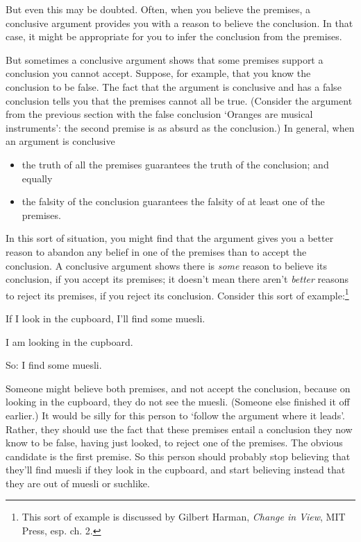 But even this may be doubted. Often, when you believe the premises, a conclusive argument provides you with a reason to believe the conclusion. In that case, it might be appropriate for you to infer the conclusion from the premises.

But sometimes a conclusive argument shows that some premises support a conclusion you cannot accept. Suppose, for example, that you know the conclusion to be false. The fact that the argument is conclusive and has a false conclusion tells you that the premises cannot all be true. (Consider the argument from the previous section with the false conclusion `Oranges are musical instruments': the second premise is as absurd as the conclusion.) In general, when an argument is conclusive \begin{itemize}
	\item the truth of all the premises guarantees the truth of the conclusion; and equally
	\item the falsity of the conclusion guarantees the falsity of at least one of the premises. 
\end{itemize}


In this sort of situation, you might find that the argument gives you a better reason to abandon any belief in one of the premises than to accept the conclusion. A conclusive argument shows there is \emph{some} reason to believe its conclusion, if you accept its premises; it doesn't mean there aren't \emph{better} reasons to reject its premises, if you reject its conclusion. Consider this sort of example:\footnote{This sort of example is discussed by Gilbert Harman, \emph{Change in View}, MIT Press, esp. ch. 2.} \begin{earg}
	\item[] If I look in the cupboard, I'll find some muesli.
	\item[] I am looking in the cupboard.
	\item[So:] I find some muesli.
\end{earg} Someone might believe both premises, and not accept the conclusion, because on looking in the cupboard, they do not see the muesli. (Someone else finished it off earlier.) It would be silly for this person to `follow the argument where it leads'. Rather, they should use the fact that these premises entail a conclusion they now know to be false, having just looked, to reject one of the premises. The obvious candidate is the first premise. So this person should probably stop believing that they'll find muesli if they look in the cupboard, and start believing instead that they are out of muesli or suchlike.

